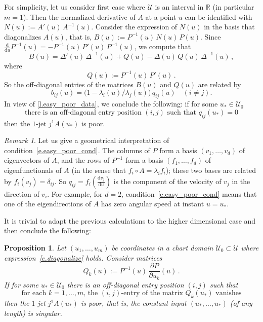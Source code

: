\documentclass[10pt, a4paper]{amsart}
\theoremstyle{plain}
\newtheorem{prop}[lemma]{Proposition}
\theoremstyle{definition}
\theoremstyle{remark}
\theoremstyle{note}
\newtheorem{rem}[lemma]{Remark}
\numberwithin{equation}{section}
\begin{document}
For simplicity, 
let us consider first case where ${\mathcal{U}}$ is an interval in ${\mathbb{R}}$ (in particular $m=1$).
Then the normalized derivative of $A$ at a point $u$ 
can be identified with $N(u):= A'(u) \, A^{-1}(u)$.
Consider the expression of $N(u)$ in the basis that diagonalizes $A(u)$, that is,
$B(u) := P^{-1}(u) \, N(u) \, P(u)$.
Since
$\frac{\mathrm{d}}{\mathrm{d}u}P^{-1}(u) = - P^{-1}(u) \, P'(u) \, P^{-1}(u)$, 
we compute that
$$
B(u) = \Delta'(u) \, \Delta^{-1}(u) 
+ Q(u) - \Delta(u) \, Q(u) \, \Delta^{-1}(u) \, , 
$$ 
where
$$
Q(u) := P^{-1}(u) \, P'(u) \, .
$$
So the off-diagonal entries of the matrices $B(u)$ and $Q(u)$ are related by
$$
b_{ij}(u) = \big(1 - \lambda_i(u) / \lambda_j(u)\big) \, q_{ij}(u)
\quad (i\neq j).
$$
In view of \cref{l.easy_poor_data}, we conclude the following:
if for some $u_* \in {\mathcal{U}}_0$
\begin{equation}\label{e.easy_poor_cond}
\text{there is an off-diagonal entry position $(i,j)$ such that $q_{ij}(u_*) = 0$}
\end{equation}
then the $1$-jet $j^1 A(u_*)$ is poor.

\begin{rem}\label{r.speed}
Let us give a geometrical interpretation of condition~\eqref{e.easy_poor_cond}.
The columns of $P$ form a basis $(v_1,\dots,v_d)$ of eigenvectors of $A$,
and the rows of $P^{-1}$ form a basis $(f_1,\dots,f_d)$ of eigenfunctionals of $A$
(in the sense that $f_i \circ A = \lambda_i f_i$); 
these two bases are related by $f_i(v_j) = \delta_{ij}$.
So $q_{ij} = f_i \left(\frac{\mathrm{d} v_j}{\mathrm{d} u}\right)$
is the component of the velocity of $v_j$ in the direction of $v_i$.
For example, for $d=2$,  condition~\eqref{e.easy_poor_cond} means 
that one of the eigendirections of $A$ has zero angular speed at instant $u=u_*$.
\end{rem}

It is trivial to adapt the previous calculations to the higher dimensional case and then conclude the following:

\begin{prop}\label{p.easy_poor_derivative}
Let $(u_1, \dots, u_m)$ be coordinates in a chart domain ${\mathcal{U}}_0\subset {\mathcal{U}}$
where expression~\eqref{e.diagonalize} holds. 
Consider matrices
\begin{equation}\label{e.Q_k}
Q_k (u) := P^{-1}(u) \, \frac{\partial P}{\partial u_k}(u) \, .
\end{equation}
If for some $u_* \in {\mathcal{U}}_0$ there is an off-diagonal entry position $(i,j)$
such that
\begin{equation}\label{e.easy_poor_cond_multdim}
\text{for each $k=1,\dots,m$, the $(i,j)$-entry of the matrix $Q_k(u_*)$ vanishes}
\end{equation} 
then the $1$-jet $j^1 A(u_*)$ is poor, that is, 
the constant input $(u_*,\dots,u_*)$ (of any length) is singular.
\end{prop}
\end{document}

